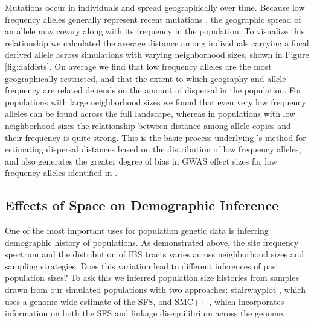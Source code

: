 \documentclass[10pt,twoside,lineno,hidelinks]{preprint}
\begin{document}
Mutations occur in individuals and spread geographically over time. Because low frequency alleles generally represent recent mutations \citep{sawyer1977past, griffiths1999ages}, the geographic spread of an allele may covary along with its frequency in the population. To visualize this relationship we calculated the average distance among individuals carrying a focal derived allele across simulations with varying neighborhood sizes, shown in Figure \ref{fig:dafdists}. On average we find that low frequency alleles are the most geographically restricted, and that the extent to which geography and allele frequency are related depends on the amount of dispersal in the population. For populations with large neighborhood sizes we found that even very low frequency alleles can be found across the full landscape, whereas in populations with low neighborhood sizes the relationship between distance among allele copies and their frequency is quite strong. This is the basic process underlying \citeauthor{Novembre2009}'s \citeyearpar{Novembre2009} method for estimating dispersal distances based on the distribution of low frequency alleles, and also generates the greater degree of bias in GWAS effect sizes for low frequency alleles identified in \citet{Mathieson2012}.


\subsection{Effects of Space on Demographic Inference}

One of the most important uses for population genetic data is inferring demographic history of populations. As demonstrated above, the site frequency spectrum and the distribution of IBS tracts varies across neighborhood sizes and sampling strategies. Does this variation lead to different inferences of past population sizes? To ask this we inferred population size histories from samples drawn from our simulated populations with two approaches: stairwayplot \citep{Liu2015}, which uses a genome-wide estimate of the SFS, and SMC++ \citep{Terhorst2016}, which incorporates information on both the SFS and linkage disequilibrium across the genome.
\end{document}
